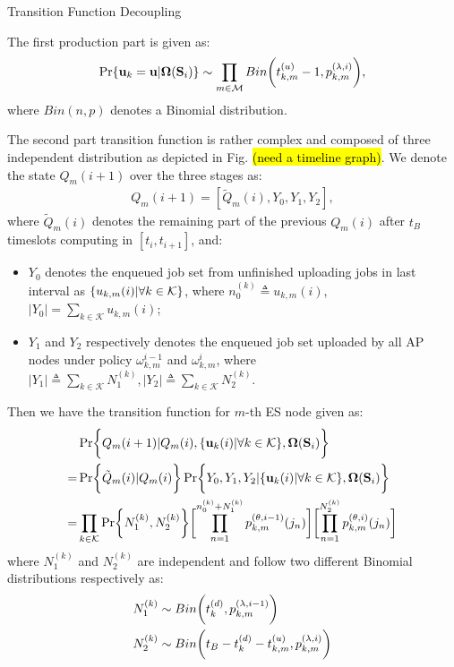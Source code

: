 \documentclass[10pt, conference, letterpaper]{IEEEtran}
\newcommand{\define}{\triangleq}
\renewcommand{\vec}{\mathbf}
\DeclarePairedDelimiter{\set}{\{}{\}}
\DeclarePairedDelimiter{\Paren}{\bigg(}{\bigg)}
\DeclarePairedDelimiter{\Bracket}{\bigg[}{\bigg]}
\DeclarePairedDelimiter{\Brace}{\bigg\{}{\bigg\}}
\newcommand{\apSet}{\mathcal{K}}
\newcommand{\esSet}{\mathcal{M}}
\newcommand{\Stat}{\mathbf{S}}
\newcommand{\Policy}{\mathbf{\Omega}}
\begin{document}
    \begin{section}{Transition Function Decoupling}
        \label{trans-decouple}

        The first production part is given as:
        \begin{align*}
            \Pr\{\vec{u}_k=\vec{u}|\Policy(\Stat_i)\} \sim \prod_{m\in\esSet}
                Bin\Paren{t^{(u)}_{k,m}-1,p^{(\lambda, i)}_{k,m}},
        \end{align*}
        where $Bin(n,p)$ denotes a Binomial distribution.
            
        The second part transition function is rather complex and composed of three independent distribution as depicted in Fig. \hl{(need a timeline graph)}. We denote the state $Q_m(i+1)$ over the three stages as:
        \begin{align*}
            Q_m(i+1) = [\tilde{Q}_m(i), Y_0, Y_1, Y_2],
        \end{align*}
        where $\tilde{Q}_m(i)$ denotes the remaining part of the previous $Q_m(i)$ after $t_B$ timeslots computing in $[t_{i}, t_{i+1}]$, and:
        \begin{itemize}
            \item $Y_0$ denotes the enqueued job set from unfinished uploading jobs in last interval as $\set{u_{k,m}(i)|\forall k\in\apSet}$, where $n^{(k)}_0 \define u_{k,m}(i)$, $|Y_0|=\sum_{k\in\apSet} u_{k,m}(i)$;
            \item $Y_1$ and $Y_2$ respectively denotes the enqueued job set uploaded by all AP nodes under policy $\omega_{k,m}^{i-1}$ and $\omega_{k,m}^{i}$, where $|Y_1|\define\sum_{k\in\apSet}N^{(k)}_1, |Y_2|\define\sum_{k\in\apSet}N^{(k)}_2$.
        \end{itemize}
        Then we have the transition function for $m$-th ES node given as:
        \begin{align*}
            & \Pr\Brace{Q_m(i+1)|Q_m(i), \set{\vec{u}_k(i)|\forall k\in\apSet}, \Policy(\Stat_i)}
            \nonumber\\
            =& \Pr\Brace{\tilde{Q}_m(i)|Q_m(i)}
                \Pr\Brace{Y_0, Y_1, Y_2|\set{\vec{u}_k(i)|\forall k\in\apSet}, \Policy(\Stat_i)}
            \nonumber\\
            =& \prod_{k\in\apSet} \Pr\Brace{N^{(k)}_1,N^{(k)}_2}
                \Bracket{
                    \prod_{n=1}^{n^{(k)}_0 + N^{(k)}_1} p^{(\theta, i-1)}_{k,m}(j_n)
                }
                \Bracket{
                    \prod_{n=1}^{N^{(k)}_2} p^{(\theta, i)}_{k,m}(j_n)
                }
        \end{align*}
        where $N^{(k)}_1$ and $N^{(k)}_2$ are independent and follow two different Binomial distributions respectively as:
        \begin{align*}
            N^{(k)}_1 &\sim Bin\Paren{t^{(d)}_k, p^{(\lambda, i-1)}_{k,m}}
            \\
            N^{(k)}_2 &\sim Bin\Paren{t_B-t^{(d)}_k-t^{(u)}_{k,m}, p^{(\lambda, i)}_{k,m}}
        \end{align*}
    \end{section}
    
    
    
\end{document}
